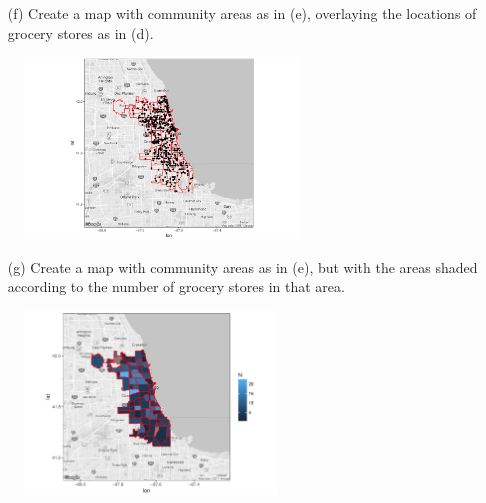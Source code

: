 \documentclass{beamer}
\begin{document}
\begin{frame}[allowframebreaks]
	
	\begin{myexccont}
	\fontsize{9pt}{11}\selectfont
		\begin{enumerate}[(a)]
            \item[(f)]
			Create a map with community areas as in (e), overlaying the locations of grocery stores as in (d).
		\end{enumerate}
	\end{myexccont}

	\begin{figure}
	\centering
	\includegraphics[width=0.65\textwidth]{figures/grocerystores2}
	\label{Fig: map}
	\end{figure}
	
	\begin{myexccont}
	\fontsize{9pt}{11}\selectfont
		\begin{enumerate}[(a)]
            \item[(g)]
			Create a map with community areas as in (e), but with the areas shaded according to the number of grocery stores in that area.
		\end{enumerate}
	\end{myexccont}

	\begin{figure}
	\centering
	\includegraphics[width=0.6\textwidth]{figures/Grocery_shaded_areas}
	\label{Fig: map}
	\end{figure}
	

\end{frame}
\end{document}
